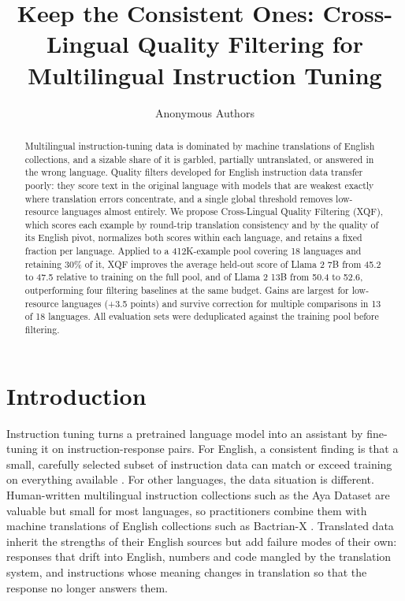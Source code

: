 \documentclass{article}
\title{Keep the Consistent Ones: Cross-Lingual Quality Filtering for Multilingual Instruction Tuning}
\author{Anonymous Authors}
\date{}
\begin{document}
\maketitle

\begin{abstract}
Multilingual instruction-tuning data is dominated by machine translations of English collections, and a sizable share of it is garbled, partially untranslated, or answered in the wrong language. Quality filters developed for English instruction data transfer poorly: they score text in the original language with models that are weakest exactly where translation errors concentrate, and a single global threshold removes low-resource languages almost entirely. We propose Cross-Lingual Quality Filtering (XQF), which scores each example by round-trip translation consistency and by the quality of its English pivot, normalizes both scores within each language, and retains a fixed fraction per language. Applied to a 412K-example pool covering 18 languages and retaining 30\% of it, XQF improves the average held-out score of Llama 2 7B from 45.2 to 47.5 relative to training on the full pool, and of Llama 2 13B from 50.4 to 52.6, outperforming four filtering baselines at the same budget. Gains are largest for low-resource languages (+3.5 points) and survive correction for multiple comparisons in 13 of 18 languages. All evaluation sets were deduplicated against the training pool before filtering.
\end{abstract}

\section{Introduction}
\label{sec:intro}

Instruction tuning turns a pretrained language model into an assistant by fine-tuning it on instruction-response pairs. For English, a consistent finding is that a small, carefully selected subset of instruction data can match or exceed training on everything available \citep{zhou2023lima,chen2024alpagasus,li2024ifd}. For other languages, the data situation is different. Human-written multilingual instruction collections such as the Aya Dataset \citep{singh2024aya} are valuable but small for most languages, so practitioners combine them with machine translations of English collections such as Bactrian-X \citep{li2023bactrianx}. Translated data inherit the strengths of their English sources but add failure modes of their own: responses that drift into English, numbers and code mangled by the translation system, and instructions whose meaning changes in translation so that the response no longer answers them.
\end{document}
